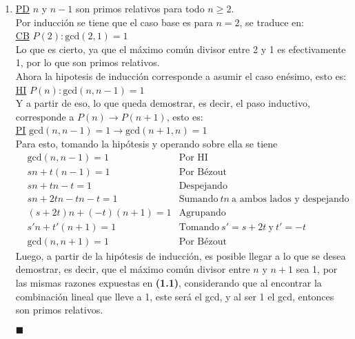 \documentclass[letter]{article}
\begin{document}
\begin{pregunta}{1}
\begin{enumerate}
		\item \underline{PD} $n$ y $n-1$ son primos relativos para todo $n \geq 2$.\\
		Por inducción se tiene que el caso base es para $n=2$, se traduce en:\\
		\underline{CB} $P(2): \text{gcd}(2, 1) = 1$\\
		Lo que es cierto, ya que el máximo común divisor entre 2 y 1 es efectivamente 1, por lo que son primos relativos.\\
		Ahora la hipotesis de inducción corresponde a asumir el caso enésimo, esto es:\\
		\underline{HI} $P(n): \text{gcd}(n, n-1) = 1$\\
		Y a partir de eso, lo que queda demostrar, es decir, el paso inductivo, corresponde a $P(n) \rightarrow P(n+1)$, esto es:\\
		\underline{PI} $\text{gcd}(n, n-1) = 1 \rightarrow \text{gcd}(n + 1, n) = 1$\\
		Para esto, tomando la hipótesis y operando sobre ella se tiene
		\begin{align*}
			&\text{gcd}(n, n-1) = 1 & \text{Por HI}\\
			&sn + t(n-1) = 1 & \text{Por Bézout}\\
			&sn + tn - t = 1 & \text{Despejando}\\
			&sn + 2tn - tn - t = 1	& \text{Sumando} \ tn \ \text{a ambos lados y despejando}\\
			&(s + 2t)n + (-t)(n + 1) = 1 & \text{Agrupando}\\
			&s'n + t'(n+1) = 1 & \text{Tomando} \ s' = s + 2t \ \text{y} \ t' = -t\\
			&\text{gcd}(n, n+1) = 1 & \text{Por Bézout}
		\end{align*}
		Luego, a partir de la hipótesis de inducción, es posible llegar a lo que se desea demostrar, es decir, que el máximo común divisor entre $n$ y $n+1$ sea 1, por las mismas razones expuestas en \textbf{(1.1)}, considerando que al encontrar la combinación lineal que lleve a 1, este será el gcd, y al ser 1 el gcd, entonces son primos relativos.
		\begin{flushright}$\blacksquare$\end{flushright}


\end{enumerate}
\end{pregunta}
\end{document}
